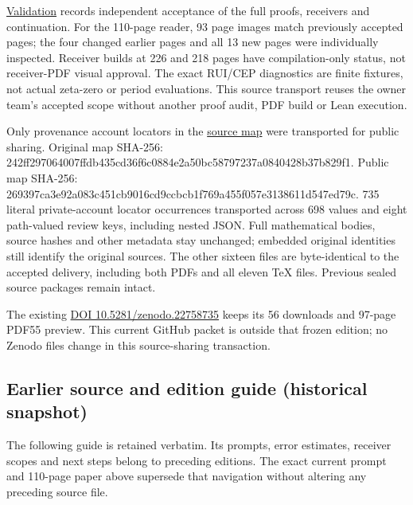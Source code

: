 \documentclass[
]{article}
\begin{document}
\href{https://github.com/KokunoYumeto/zeta-function-research-reader/blob/main/workbenches/splitzero-tandem/continuations/20260914-exterior-kernel-continuation/12_VALIDATION.md}{Validation}
records independent acceptance of the full proofs, receivers and
continuation. For the 110-page reader, 93 page images match previously
accepted pages; the four changed earlier pages and all 13 new pages were
individually inspected. Receiver builds at 226 and 218 pages have
compilation-only status, not receiver-PDF visual approval. The exact
RUI/CEP diagnostics are finite fixtures, not actual zeta-zero or period
evaluations. This source transport reuses the owner team's accepted
scope without another proof audit, PDF build or Lean execution.

Only provenance account locators in the
\href{https://github.com/KokunoYumeto/zeta-function-research-reader/blob/main/workbenches/splitzero-tandem/continuations/20260914-exterior-kernel-continuation/11_SOURCE_MAP.json}{source
map} were transported for public sharing. Original map SHA-256:
242ff297064007ffdb435cd36f6c0884e2a50bc58797237a0840428b37b829f1. Public
map SHA-256:
269397ca3e92a083c451cb9016cd9ccbcb1f769a455f057e3138611d547ed79c. 735
literal private-account locator occurrences transported across 698
values and eight path-valued review keys, including nested JSON. Full
mathematical bodies, source hashes and other metadata stay unchanged;
embedded original identities still identify the original sources. The
other sixteen files are byte-identical to the accepted delivery,
including both PDFs and all eleven TeX files. Previous sealed source
packages remain intact.

The existing \href{https://doi.org/10.5281/zenodo.22758735}{DOI
10.5281/zenodo.22758735} keeps its 56 downloads and 97-page PDF55
preview. This current GitHub packet is outside that frozen edition; no
Zenodo files change in this source-sharing transaction.

\subsection{Earlier source and edition guide (historical
snapshot)}\label{earlier-source-and-edition-guide-historical-snapshot-11}

The following guide is retained verbatim. Its prompts, error estimates,
receiver scopes and next steps belong to preceding editions. The exact
current prompt and 110-page paper above supersede that navigation
without altering any preceding source file.
\end{document}
